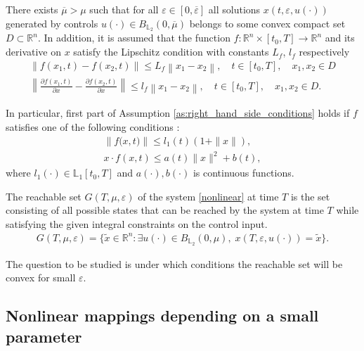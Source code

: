 \documentclass[../main.tex]{subfiles}
\begin{document}
\begin{assumption}\label{as:right_hand_side_conditions}
	
	There exists $\overline{\mu} > \mu $ such that for all $\varepsilon \in [0, \overline{\varepsilon}] $ all solutions $ x(t,\varepsilon, u(\cdot)) $ generated by controls $u(\cdot) \in B_{\mathbb{L}_2}(0,\overline{\mu})$  belongs to some convex compact set $D \subset \mathbb{R}^n$.
	In addition, it is assumed that the function $f: \mathbb{R}^n \times [t_0,T] \to \mathbb{R}^n$ and its derivative on $x$ satisfy the Lipschitz condition with constants $L_f$, $l_f$ respectively
	\begin{gather*}
		\left\| f(x_1,t) - f(x_2,t) \right\| \leqslant L_f \left\| x_1 - x_2 \right\|, \quad t\in[t_0,T], \quad x_1, x_2 \in D\\
		\left\| \frac{\partial f(x_1,t)}{\partial x} - \frac{\partial f(x_2,t)}{\partial x} \right\| \leqslant l_f \left\| x_1 - x_2 \right\|, \quad t\in[t_0,T], \quad x_1, x_2 \in D.
	\end{gather*}
\end{assumption} 

In particular, first part of Assumption \ref{as:right_hand_side_conditions} holds if  $f$ satisfies one of the following conditions \cite{Fillipov2}:
\begin{gather}\label{sublinear_growth}
	\left\|f\big(x,t\big) \right\| \leqslant l_1(t) (1 + \|x\|), \\ 
	x \cdot f(x,t) \leqslant a(t) \|x\|^2 + b(t),
\end{gather}
where $l_1(\cdot) \in \mathbb{L}_1[t_0,T]$ and $a(\cdot), b(\cdot)$ is continuous functions.

\begin{definition} 
	The reachable set $G(T,\mu,\varepsilon) $ of the system \eqref{nonlinear} at time $T$ is the set consisting of all possible states that can be reached by the system at time $T$ while satisfying the given integral constraints on the control input.
	\begin{gather*}
		G(T,\mu,\varepsilon) =\{\widetilde{x}\in \mathbb{R}^n:\exists u(\cdot)\in B_{\mathbb{L}_2}(0,\mu),\; x(T,\varepsilon,u(\cdot)) = \widetilde{x}\}.
	\end{gather*}
\end{definition} 
The question to be studied is under which conditions the reachable set will be convex for small $\varepsilon$.

\subsection{Nonlinear mappings depending on a small parameter}
\end{document}
